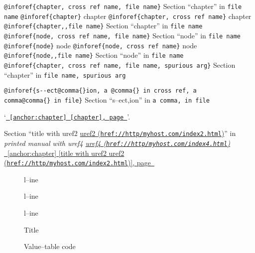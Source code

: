 \documentclass{book}
\begin{document}
\texttt{@inforef\{chapter,\ cross ref name,\ file name\}} Section ``chapter'' in \texttt{file name}
\texttt{@inforef\{chapter\}} chapter
\texttt{@inforef\{chapter,\ cross ref name\}} chapter
\texttt{@inforef\{chapter{,}{,}file name\}} Section ``chapter'' in \texttt{file name}
\texttt{@inforef\{node,\ cross ref name,\ file name\}} Section ``node'' in \texttt{file name}
\texttt{@inforef\{node\}} node
\texttt{@inforef\{node,\ cross ref name\}} node
\texttt{@inforef\{node{,}{,}file name\}} Section ``node'' in \texttt{file name}
\texttt{@inforef\{chapter,\ cross ref name,\ file name,\ spurious arg\}} Section ``chapter'' in \texttt{file name,\ spurious arg}

\texttt{@inforef\{s{-}{-}ect@comma\{\}ion,\ a @comma\{\}\ in cross
ref,\ a comma@comma\{\}\ in file\}}
Section ``s--ect,ion'' in \texttt{a comma,\ in file}

`\texttt{\hyperref[anchor:chapter]{\chaptername~\ref*{anchor:chapter} [chapter], page~\pageref*{anchor:chapter}}}'.

Section ``title with uref2 \href{href://http/myhost.com/index2.html}{uref2 (\nolinkurl{href://http/myhost.com/index2.html})}'' in \textsl{printed manual with uref4 \href{href://http/myhost.com/index4.html}{uref4 (\nolinkurl{href://http/myhost.com/index4.html})}}
\hyperref[anchor:chapter]{\chaptername~\ref*{anchor:chapter} [title with uref2 \href{href://http/myhost.com/index2.html}{uref2 (\nolinkurl{href://http/myhost.com/index2.html})}], page~\pageref*{anchor:chapter}}

\begin{description}
\item[{\parbox[b]{\linewidth}{%
\textbf{a--strong}}}]
l--ine
\end{description}

\begin{description}
\item[{\parbox[b]{\linewidth}{%
a--asis\\
\index[cp]{a--asis@\texttt{a{-}{-}asis}}%
b
\index[cp]{b@\texttt{b}}%
}}]
l--ine
\end{description}

\begin{description}
\item[{\parbox[b]{\linewidth}{%
\emph{a}\\
\index[fn]{a@\texttt{a}}%
\index[cp]{index entry between item and itemx}%
\emph{b}
\index[fn]{b@\texttt{b}}%
}}]
l--ine
\end{description}

\begin{description}
\item[] Title
\item[{\parbox[b]{\linewidth}{%
\texttt{a{-}{-}code}}}]
Value--table code
\end{description}
\end{document}

